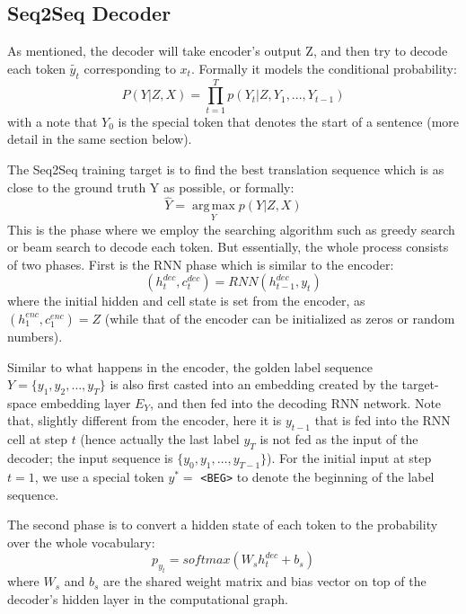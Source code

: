 \documentclass[11pt,a4paper]{article}
\begin{document}
\subsection{Seq2Seq Decoder}
As mentioned, the decoder will take encoder's output Z, and then try to decode each token $\tilde{y_t}$ corresponding to $x_t$. Formally it models the conditional probability: 
  \begin{equation}
      P(Y|Z,X) = \prod_{t=1}^{T} p(Y_t|{Z}, Y_1, ..., Y_{t-1})
  \end{equation}
with a note that $Y_0$ is the special token that denotes the start of a sentence (more detail in the same section below). 

The Seq2Seq training target is to find the best translation sequence which is as close to the ground truth Y as possible, or formally:
  \begin{equation}
      \widehat{Y} = \operatorname*{arg\,max}_{Y} p(Y|Z, X) 
  \end{equation}
This is the phase where we employ the searching algorithm such as greedy search or beam search to decode each token. But essentially, the whole process consists of two phases. First is the RNN phase which is similar to the encoder: 
  \begin{equation}
      (h^{dec}_t, c^{dec}_t) = RNN(h^{dec}_{t-1}, y_t) \label{eq:rnn_dec}
  \end{equation}
where the initial hidden and cell state is set from the encoder, as $(h^{enc}_1, c^{enc}_1) = Z$ (while that of the encoder can be initialized as zeros or random numbers). 

Similar to what happens in the encoder, the golden label sequence $Y = \{y_1, y_2, \dots, y_{T}\}$ is also first casted into an embedding created by the target-space embedding layer $E_Y$, and then fed into the decoding RNN network. Note that, slightly different from the encoder, here it is $y_{t-1}$ that is fed into the RNN cell at step $t$ (hence actually the last label $y_{T}$ is not fed as the input of the decoder; the input sequence is $\{y_0, y_1, \dots, y_{T-1}\}$). For the initial input at step $t = 1$, we use a special token $y^* =$ \texttt{<BEG>} to denote the beginning of the label sequence.

The second phase is to convert a hidden state of each token to the probability over the whole vocabulary: 
  \begin{equation}
      p_{y_t} = softmax(W_{s} h^{dec}_t + b_{s}) \label{eq:pt}
  \end{equation}
where $W_{s}$ and $b_{s}$ are the shared weight matrix and bias vector on top of the decoder's hidden layer in the computational graph. 
\end{document}

